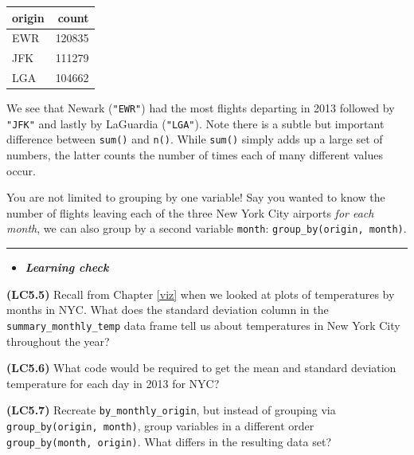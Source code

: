 \documentclass[]{tufte-book}
\newenvironment{Shaded}{\begin{snugshade}}{\end{snugshade}}
\newcommand{\KeywordTok}[1]{\textcolor[rgb]{0.13,0.29,0.53}{\textbf{{#1}}}}
\newcommand{\DataTypeTok}[1]{\textcolor[rgb]{0.13,0.29,0.53}{{#1}}}
\newcommand{\StringTok}[1]{\textcolor[rgb]{0.31,0.60,0.02}{{#1}}}
\newcommand{\NormalTok}[1]{{#1}}
\let\oldrule=\rule
\renewcommand{\rule}[1]{\oldrule{\linewidth}}
\newenvironment{rmdblock}[1]
  {\begin{shaded*}
  \begin{itemize}
  \renewcommand{\labelitemi}{
    \raisebox{-.7\height}[0pt][0pt]{
    }
  }
  \item
  }
  {
  \end{itemize}
  \end{shaded*}
  }
\newenvironment{learncheck}
  {\begin{rmdblock}{warning}}
  {\end{rmdblock}}
\begin{document}
\begin{tabular}{l|r}
\hline
origin & count\\
\hline
EWR & 120835\\
\hline
JFK & 111279\\
\hline
LGA & 104662\\
\hline
\end{tabular}

We see that Newark (\texttt{"EWR"}) had the most flights departing in
2013 followed by \texttt{"JFK"} and lastly by LaGuardia
(\texttt{"LGA"}). Note there is a subtle but important difference
between \texttt{sum()} and \texttt{n()}. While \texttt{sum()} simply
adds up a large set of numbers, the latter counts the number of times
each of many different values occur.

You are not limited to grouping by one variable! Say you wanted to know
the number of flights leaving each of the three New York City airports
\emph{for each month}, we can also group by a second variable
\texttt{month}: \texttt{group\_by(origin,\ month)}.

\begin{Shaded}
\end{Shaded}

\begin{center}\rule{0.5\linewidth}{\linethickness}\end{center}

\begin{learncheck}
\textbf{\emph{Learning check}}
\end{learncheck}

\textbf{(LC5.5)} Recall from Chapter \ref{viz} when we looked at plots
of temperatures by months in NYC. What does the standard deviation
column in the \texttt{summary\_monthly\_temp} data frame tell us about
temperatures in New York City throughout the year?

\textbf{(LC5.6)} What code would be required to get the mean and
standard deviation temperature for each day in 2013 for NYC?

\textbf{(LC5.7)} Recreate \texttt{by\_monthly\_origin}, but instead of
grouping via \texttt{group\_by(origin,\ month)}, group variables in a
different order \texttt{group\_by(month,\ origin)}. What differs in the
resulting data set?
\end{document}
